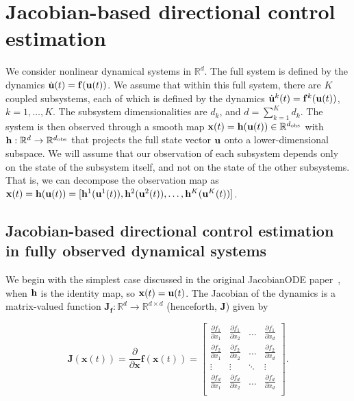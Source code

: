 \section{Jacobian-based directional control estimation}
\label{sec:interareal-control-methods}

We consider nonlinear dynamical systems in $\mathbb{R}^d$. The full system is defined by the dynamics $\dot{\vb{u}}(t) = \vb{f}(\vb{u}(t))$. We assume that within this full system, there are $K$ coupled subsystems, each of which is defined by the dynamics $\dot{\vb{u}}^k(t) = \vb{f}^k(\vb{u}(t))$, $k = 1, \ldots, K$. The subsystem dimensionalities are $d_k$, and $d = \sum_{k=1}^{K} d_k$. The system is then observed through a smooth map $\vb{x}(t)=\vb{h}(\vb{u}(t))\in\mathbb{R}^{d_{\mathrm{obs}}}$ with $\vb{h}: \mathbb{R}^d \to \mathbb{R}^{d_{\mathrm{obs}}}$ that projects the full state vector $\vb{u}$ onto a lower-dimensional subspace. We will assume that our observation of each subsystem depends only on the state of the subsystem itself, and not on the state of the other subsystems. That is, we can decompose the observation map as $\vb{x}(t) = \vb{h}(\vb{u}(t)) = [\vb{h}^1(\vb{u}^1(t)), \vb{h}^2(\vb{u}^2(t)), \ldots, \vb{h}^K(\vb{u}^K(t))]$.

\subsection{Jacobian-based directional control estimation in fully observed dynamical systems}

We begin with the simplest case discussed in the original JacobianODE paper~\cite{Eisen2025-wt}, when $\vb{h}$ is the identity map, so $\vb{x}(t) = \vb{u}(t)$. The Jacobian of the dynamics is a matrix-valued function $\mathbf{J}_\mathbf{f}: \mathbb{R}^d \to \mathbb{R}^{d \times d}$ (henceforth, $\mathbf{J}$) given by

\begin{equation}
\mathbf{J}(\mathbf{x}(t)) = \frac{\partial }{\partial \mathbf{x}}\mathbf{f}(\mathbf{x}(t)) =
\begin{bmatrix}
\frac{\partial f_1 }{\partial x_1}& \frac{\partial f_1}{\partial x_2} & \dots & \frac{\partial f_1}{\partial x_d} \\
\frac{\partial f_2 }{\partial x_1}& \frac{\partial f_2}{\partial x_2} & \dots & \frac{\partial f_2}{\partial x_d} \\
\vdots & \vdots & \ddots & \vdots \\
\frac{\partial f_d }{\partial x_1}& \frac{\partial f_d}{\partial x_2} & \dots & \frac{\partial f_d}{\partial x_d} \\
\end{bmatrix}.
\end{equation}


